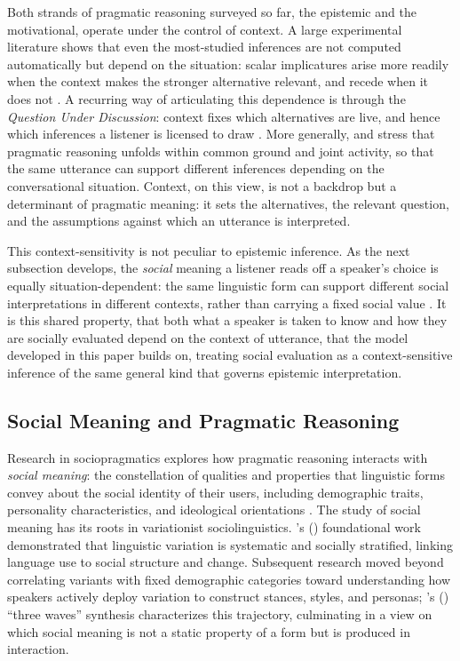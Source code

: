 \documentclass[12pt,a4paper]{article}
\begin{document}
Both strands of pragmatic reasoning surveyed so far, the epistemic and the
motivational, operate under the control of context. A large experimental
literature shows that even the most-studied inferences are not computed
automatically but depend on the situation: scalar implicatures arise more
readily when the context makes the stronger alternative relevant, and recede
when it does not \citep{BrehenyKatsosWilliams2006,DegenTanenhaus2015}. A
recurring way of articulating this dependence is through the \emph{Question Under
Discussion}: context fixes which alternatives are live, and hence which
inferences a listener is licensed to draw \citep{roberts2012}. More generally,
\citet{vanRooij2003} and \citet{Clark1996} stress that pragmatic reasoning
unfolds within common ground and joint activity, so that the same utterance can
support different inferences depending on the conversational situation. Context,
on this view, is not a backdrop but a determinant of pragmatic meaning: it sets
the alternatives, the relevant question, and the assumptions against which an
utterance is interpreted.

This context-sensitivity is not peculiar to epistemic inference. As the next
subsection develops, the \emph{social} meaning a listener reads off a speaker's
choice is equally situation-dependent: the same linguistic form can support
different social interpretations in different contexts, rather than carrying a
fixed social value \citep{campbellkibler2007}. It is this shared property, that both what a speaker is taken
to know and how they are socially evaluated depend on the context of utterance,
that the model developed in this paper builds on, treating social evaluation as a
context-sensitive inference of the same general kind that governs epistemic
interpretation.

\subsection{Social Meaning and Pragmatic Reasoning}

Research in sociopragmatics explores how pragmatic reasoning interacts with
\emph{social meaning}: the constellation of qualities and properties that
linguistic forms convey about the social identity of their users, including
demographic traits, personality characteristics, and ideological orientations
\citep{beltrama2020,Eckert2008,Podesva2011,Silverstein2003}. The study of
social meaning has its roots in variationist sociolinguistics.
\citeauthor{Labov1972}'s (\citeyear{Labov1972}) foundational work demonstrated
that linguistic variation is systematic and socially stratified, linking language
use to social structure and change. Subsequent research moved beyond correlating
variants with fixed demographic categories toward understanding how speakers
actively deploy variation to construct stances, styles, and personas;
\citeauthor{Eckert2012}'s (\citeyear{Eckert2012}) ``three waves'' synthesis
characterizes this trajectory, culminating in a view on which social meaning is
not a static property of a form but is produced in interaction.
\end{document}
